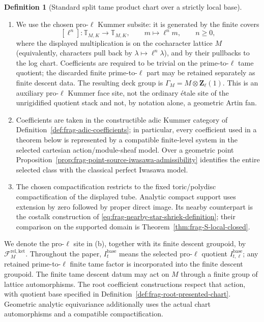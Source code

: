 \documentclass[11pt]{article}
\theoremstyle{definition}
\newtheorem{definition}[theorem]{Definition}
\theoremstyle{remark}
\begin{document}
\begin{definition}[Standard split tame product chart over a strictly local base]
\begin{enumerate}[label=\textup{(\alph*)}]
  the whole generic fibre.  Here
$\mathbb D^e$ is a relatively open polydisc and the displayed product is a
specified chart isomorphism.  The chart also
supplies the rank-$e$ smooth tangent bundle $\mathcal E_{\mathrm{sm}}$ on $S$
obtained by restricting the relative tangent bundle of the polydisc factor to
its zero section.  On the split chart it is $\mathcal O_S^e$; its descent
datum is part of the product chart.
\item We use the chosen pro-$\ell$ Kummer subsite: it is generated by the
finite covers
\[
   [\ell^n]:\mathbb T_{M,K}\longrightarrow\mathbb T_{M,K},
   \qquad m\longmapsto \ell^n m,
   \qquad n\geq 0,
\]
where the displayed multiplication is on the cocharacter lattice $M$
(equivalently, characters pull back by $\lambda\mapsto\ell^n\lambda$),
and by their pullbacks to the log chart.  Coefficients are required to be
trivial on the prime-to-$\ell$ tame quotient; the discarded finite
prime-to-$\ell$ part may be retained separately as finite descent data.  The
resulting deck group is $\Gamma_M=M\otimes\mathbf Z_\ell(1)$.  This is an
auxiliary pro-$\ell$ Kummer face site, not the ordinary \'{e}tale site of the
unrigidified quotient stack and not, by notation alone, a geometric Artin
fan.
\item Coefficients are taken in the constructible adic Kummer category of
Definition~\ref{def:frag-adic-coefficients}; in particular, every coefficient
used in a theorem below is represented by a compatible finite-level system
  in the selected cartesian action/module-sheaf model.
  Over a geometric point Proposition~\ref{prop:frag-point-source-iwasawa-admissibility}
  identifies the entire selected class with the classical perfect
  Iwasawa model.
\item The chosen compactification restricts to the fixed toric/polydisc
  compactification of the displayed tube.  Analytic compact support uses
  extension by zero followed by proper direct image.  Its nearby counterpart
  is the costalk construction of \eqref{eq:frag-nearby-star-shriek-definition};
  their comparison on the supported domain is
  Theorem~\ref{thm:frag-S-local-closed}.
\end{enumerate}
We denote the pro-$\ell$ site in (b), together with its finite descent
groupoid, by $\mathcal F_M^{\mathrm{rel,ket}}$.
Throughout the paper, $I_t^{\mathrm{base}}$ means the selected pro-$\ell$
quotient $I_{t,\ell}^{\mathrm{base}}$; any retained prime-to-$\ell$ finite
tame factor is incorporated into the finite descent groupoid.
The finite tame descent datum may act on $M$ through a finite group
of lattice automorphisms.  The root coefficient constructions respect
that action, with quotient base specified in
Definition~\ref{def:frag-root-presented-chart}.  Geometric analytic
equivariance additionally uses the actual chart automorphisms and
a compatible compactification.
\end{definition}
\end{document}

